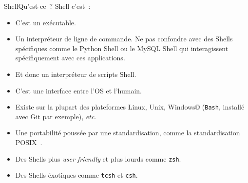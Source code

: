 \documentclass{beamer}
\begin{document}
    \begin{frame}{Shell}{Qu'est-ce~?}
        Shell c'est~:
        \begin{itemize}
            \item C'est un exécutable.
            \item Un interpréteur de ligne de commande.
            Ne pas confondre avec des Shells spécifiques comme le Python Shell ou le MySQL Shell qui interagissent spécifiquement avec ces applications.
            \item Et donc un interpréteur de scripts Shell.
            \item C'est une interface entre l'OS et l'humain.
            \item Existe sur la plupart des plateformes Linux, Unix, Windows® (\lstinline{Bash}, installé avec Git par exemple), \textit{etc}.
            \item Une portabilité poussée par une standardisation, comme la standardisation POSIX~.
            \item Des Shells plus \textit{user friendly} et plus lourds comme \lstinline{zsh}.
            \item Des Shells éxotiques comme \lstinline{tcsh} et \lstinline{csh}.
        \end{itemize}
    \end{frame}
\end{document}
